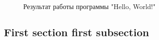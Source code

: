 \documentclass[a4paper,14pt]{extarticle}
\begin{document}
    \begin{figure}[H]
        \centering

        \hspace{.15\linewidth}
        \\
        \hspace{.15\linewidth}
        
        \caption{Результат работы программы "Hello, World!"}
    \end{figure}

    \subsection{First section first subsection}
\end{document}

